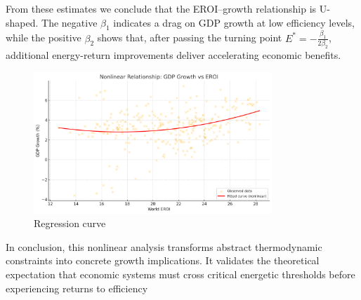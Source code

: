 \documentclass[a4paper,12pt]{article}
\begin{document}
\begin{table}[h!]
\centering
{}
\caption{Estimated coefficient table for the quadratic regression model.}
\label{tab:coefficients}
\end{table}
From these estimates we conclude that the EROI–growth relationship is U-shaped. The negative \( \beta_1 \) indicates a drag on GDP growth at low efficiency levels, while the positive \( \beta_2 \) shows that, after passing the turning point \( E^* = -\frac{\beta_1}{2\beta_2} \), additional energy-return improvements deliver accelerating economic benefits.
\begin{figure}[h]
  \centering
  \includegraphics[width=0.8\textwidth]{figures/regression.png}
  \caption{Regression curve}
  \label{fig:yourlabel}
\end{figure}

In conclusion, this nonlinear analysis transforms abstract thermodynamic constraints into concrete growth implications. It validates the theoretical expectation that economic systems must cross critical energetic thresholds before experiencing returns to efficiency
\end{document}
